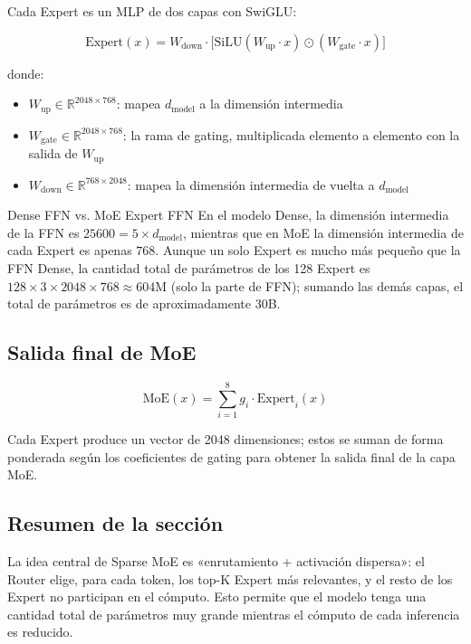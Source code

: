 Cada Expert es un MLP de dos capas con SwiGLU:

$$
\text{Expert}(x) = W_{\text{down}} \cdot \big[ \text{SiLU}(W_{\text{up}} \cdot x) \odot (W_{\text{gate}} \cdot x) \big]
$$

donde:
\begin{itemize}
  \item $W_{\text{up}} \in \mathbb{R}^{2048 \times 768}$: mapea $d_{\text{model}}$ a la dimensión intermedia
  \item $W_{\text{gate}} \in \mathbb{R}^{2048 \times 768}$: la rama de gating, multiplicada elemento a elemento con la salida de $W_{\text{up}}$
  \item $W_{\text{down}} \in \mathbb{R}^{768 \times 2048}$: mapea la dimensión intermedia de vuelta a $d_{\text{model}}$
\end{itemize}

\begin{knowledgebox}{Dense FFN vs. MoE Expert FFN}
En el modelo Dense, la dimensión intermedia de la FFN es $25600 = 5 \times d_{\text{model}}$, mientras que en MoE la dimensión intermedia de cada Expert es apenas $768$. Aunque un solo Expert es mucho más pequeño que la FFN Dense, la cantidad total de parámetros de los 128 Expert es $128 \times 3 \times 2048 \times 768 \approx 604\text{M}$ (solo la parte de FFN); sumando las demás capas, el total de parámetros es de aproximadamente 30B.
\end{knowledgebox}

\subsection{Salida final de MoE}

$$
\text{MoE}(x) = \sum_{i=1}^{8} g_i \cdot \text{Expert}_i(x)
$$

Cada Expert produce un vector de 2048 dimensiones; estos se suman de forma ponderada según los coeficientes de gating para obtener la salida final de la capa MoE.

\subsection{Resumen de la sección}

La idea central de Sparse MoE es «enrutamiento + activación dispersa»: el Router elige, para cada token, los top-K Expert más relevantes, y el resto de los Expert no participan en el cómputo. Esto permite que el modelo tenga una cantidad total de parámetros muy grande mientras el cómputo de cada inferencia es reducido.
